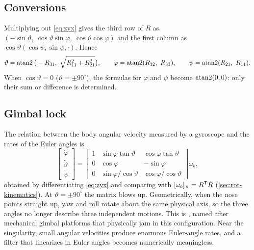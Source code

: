 \subsection{Conversions}

Multiplying out \eqref{eq:zyx} gives the third row of $R$ as $(-\sin\vartheta,\ \cos\vartheta\sin\varphi,\ \cos\vartheta\cos\varphi)$ and the first column as
$\cos\vartheta(\cos\psi, \sin\psi, \cdot)$. Hence
\begin{equation}
  \vartheta = \atantwo\big(-R_{31},\ \sqrt{R_{11}^2 + R_{21}^2}\big), \qquad
  \varphi = \atantwo(R_{32},\ R_{33}), \qquad
  \psi = \atantwo(R_{21},\ R_{11}) .
\end{equation}
When $\cos\vartheta = 0$ ($\vartheta = \pm90^\circ$), the formulas for $\varphi$ and $\psi$ become $\operatorname{atan2}(0, 0)$: only their sum or difference is determined.

\subsection{Gimbal lock}

The relation between the body angular velocity measured by a gyroscope and the rates of the Euler angles is
\begin{equation}
  \begin{bmatrix} \dot\varphi \\ \dot\vartheta \\ \dot\psi \end{bmatrix}
  = \begin{bmatrix}
      1 & \sin\varphi\tan\vartheta & \cos\varphi\tan\vartheta \\
      0 & \cos\varphi & -\sin\varphi \\
      0 & \sin\varphi/\cos\vartheta & \cos\varphi/\cos\vartheta
    \end{bmatrix} \omega_b ,
  \label{eq:euler-rates}
\end{equation}
obtained by differentiating \eqref{eq:zyx} and comparing with $[\omega_b]_{\times} = R^{\mathsf{T}}\dot R$ (\cref{sec:rot-kinematics}). At $\vartheta = \pm90^\circ$ the
matrix blows up. Geometrically, when the nose points straight up, yaw and roll rotate about the same physical axis, so the three angles no
longer describe three independent motions. This is , named after mechanical gimbal platforms that physically jam in this
configuration. Near the singularity, small angular velocities produce enormous Euler-angle rates, and a filter that linearizes in Euler
angles becomes numerically meaningless.

